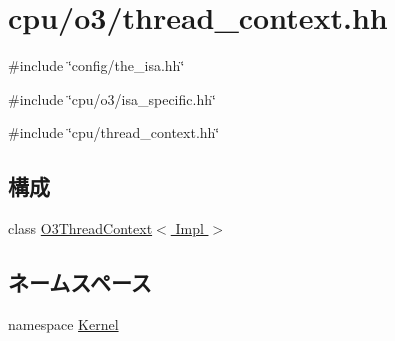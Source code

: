 \hypertarget{o3_2thread__context_8hh}{
\section{cpu/o3/thread\_\-context.hh}
\label{o3_2thread__context_8hh}
}
{\ttfamily \#include \char`\"{}config/the\_\-isa.hh\char`\"{}}\par
{\ttfamily \#include \char`\"{}cpu/o3/isa\_\-specific.hh\char`\"{}}\par
{\ttfamily \#include \char`\"{}cpu/thread\_\-context.hh\char`\"{}}\par
\subsection*{構成}
\begin{DoxyCompactItemize}
\item 
class \hyperlink{classO3ThreadContext}{O3ThreadContext$<$ Impl $>$}
\end{DoxyCompactItemize}
\subsection*{ネームスペース}
\begin{DoxyCompactItemize}
\item 
namespace \hyperlink{namespaceKernel}{Kernel}
\end{DoxyCompactItemize}
